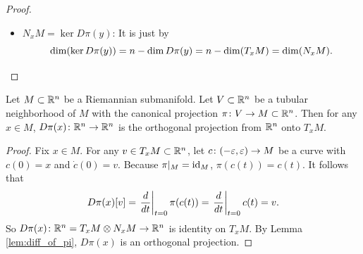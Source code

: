 \begin{proof}
\begin{itemize}
        \item $N_xM = \ker D\pi(y)$: It is just by
        \begin{equation*}
            \operatorname{dim}(\ker D\pi(y)) = n - \operatorname{dim} D\pi(y) = n - \operatorname{dim} (T_xM) = \operatorname{dim} (N_xM). \qedhere
        \end{equation*}
    \end{itemize}
\end{proof}


\begin{cor}\label{cor:proj_by_pi}
    Let $M \subset \mathbb{R}^n$ be a Riemannian submanifold. Let $V \subset \mathbb{R}^n$ be a tubular neighborhood of $M$ with the canonical projection $\pi \colon V \rightarrow M \subset \mathbb{R}^n$. Then for any $x \in M$, $D\pi(x) \colon \mathbb{R}^n \rightarrow \mathbb{R}^n$ is the orthogonal projection from $\mathbb{R}^n$ onto $T_xM$.
\end{cor}
\begin{proof}
    Fix $x \in M$. For any $v \in T_xM \subset \mathbb{R}^n$, let $c \colon (-\varepsilon,\varepsilon) \rightarrow M$ be a curve with $c(0) = x$ and $\dot{c}(0) = v$. Because $\pi |_M = \operatorname{id}_M$, $\pi(c(t)) = c(t)$. It follows that
    \begin{equation*}
        D\pi(x)[v] = \left.\frac{d}{dt}\right\lvert_{t = 0} \pi(c(t)) = \left.\frac{d}{dt}\right\lvert_{t = 0} c(t) = v.
    \end{equation*}
    So $D\pi(x) \colon \mathbb{R}^n = T_xM \otimes N_xM \rightarrow \mathbb{R}^n$ is identity on $T_xM$. By Lemma \ref{lem:diff_of_pi}, $D\pi(x)$ is an orthogonal projection.
\end{proof}


